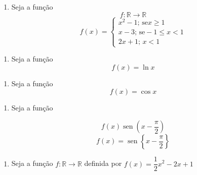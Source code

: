 \documentclass[a4paper, 12pt]{article}
\DeclareMathOperator{\sen}{sen} %
\begin{document}
\begin{enumerate}
  \item Seja a função
    $$f : \mathbb{R} \to \mathbb{R}$$
    $$f(x) =
    \begin{cases}
      x^2 - 1;\,\textrm{se} x \geq 1 \\
      x -3;\, \textrm{se} -1 \leq x < 1 \\
      2x + 1 ;\,x < 1
    \end{cases}
  $$
\end{enumerate}

\begin{enumerate}
  \item Seja a função
    $$f(x) = \ln x$$
\end{enumerate}


\begin{enumerate}
  \item Seja a função
  $$f(x) = \cos x$$
\end{enumerate}

\begin{enumerate}
  \item Seja a função

    $$f(x) \sen \left(x - \frac{\pi}{2}\right)
    $$
    $$f(x) = \sen \left\{x - \frac{\pi}{2}\right\} 
    $$
\end{enumerate}

\begin{enumerate}

  \item Seja a função $f : \mathbb{R} \to \mathbb{R}$ definida por $f(x) = \dfrac{1}{2}x^2 - 2x +1$

\end{enumerate}
\end{document}

